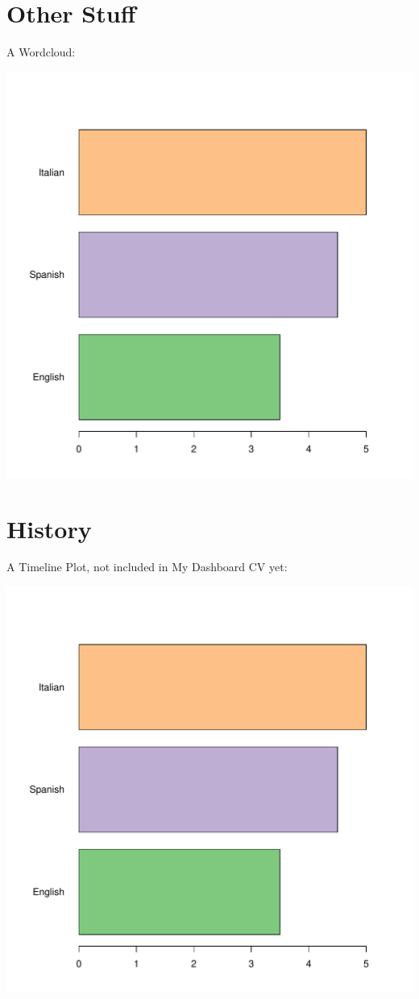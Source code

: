 \documentclass[10pt,a4paper]{article}
\begin{document}
\section{Other Stuff}
A Wordcloud:

\includegraphics[page=4]{Rplots.pdf}
\newpage

%
%

\section{History}
A Timeline Plot, not included in My Dashboard CV yet:

\includegraphics[page=6]{Rplots.pdf}
\newpage


%
%
\end{document}
